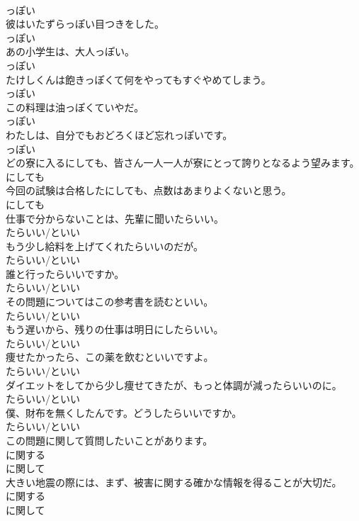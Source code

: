\documentclass[8pt]{extreport}
\begin{document}
\begin{CJK}{UTF8}{min}
\\	っぽい
\\	彼はいたずらっぽい目つきをした。	
\\	っぽい
\\	あの小学生は、大人っぽい。	
\\	っぽい
\\	たけしくんは飽きっぽくて何をやってもすぐやめてしまう。	
\\	っぽい
\\	この料理は油っぽくていやだ。	
\\	っぽい
\\	わたしは、自分でもおどろくほど忘れっぽいです。	
\\	っぽい
\\	どの寮に入るにしても、皆さん一人一人が寮にとって誇りとなるよう望みます。	
\\	にしても
\\	今回の試験は合格したにしても、点数はあまりよくないと思う。	
\\	にしても
\\	仕事で分からないことは、先輩に聞いたらいい。	
\\	たらいい/といい
\\	もう少し給料を上げてくれたらいいのだが。	
\\	たらいい/といい
\\	誰と行ったらいいですか。	
\\	たらいい/といい
\\	その問題についてはこの参考書を読むといい。	
\\	たらいい/といい
\\	もう遅いから、残りの仕事は明日にしたらいい。	
\\	たらいい/といい
\\	痩せたかったら、この薬を飲むといいですよ。	
\\	たらいい/といい
\\	ダイエットをしてから少し痩せてきたが、もっと体調が減ったらいいのに。	
\\	たらいい/といい
\\	僕、財布を無くしたんです。どうしたらいいですか。	
\\	たらいい/といい
\\	この問題に関して質問したいことがあります。	
\\	に関する 
\\	に関して
\\	大きい地震の際には、まず、被害に関する確かな情報を得ることが大切だ。	
\\	に関する 
\\	に関して

\end{CJK}
\end{document}
